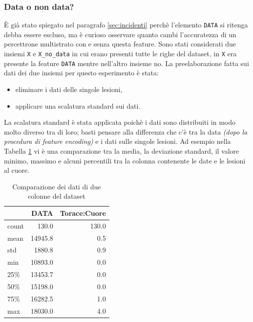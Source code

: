\documentclass[12pt, twoside, letterpaper]{report}
\begin{document}
			\subsubsection{Data o non data?}			
				È già stato spiegato nel paragrafo \ref{sec:incidenti} perchè l'elemento \texttt{DATA} si ritenga debba essere escluso, ma è curioso osservare quanto cambi l'accuratezza di un percettrone multistrato con e senza questa feature. Sono stati considerati due insiemi \texttt{X} e \texttt{X\_no\_data} in cui erano presenti tutte le righe del dataset, in \texttt{X} era presente la feature \texttt{DATA} mentre nell'altro insieme no. La preelaborazione fatta sui dati dei due insiemi per questo esperimento è stata: 
				\begin{itemize}
					\item eliminare i dati delle singole lesioni,
					\item applicare una scalatura standard sui dati.
				\end{itemize}
				La scalatura standard è stata applicata poichè i dati sono distribuiti in modo molto diverso tra di loro; basti pensare alla differenza che c'è tra la data \textit{(dopo la procedura di feature encoding)} e i dati sulle singole lesioni. Ad esempio nella Tabella \ref{tab:differenza_data} vi è una comparazione tra la media, la deviazione standard, il valore minimo, massimo e alcuni percentili tra la colonna contenente le date e le lesioni al cuore.
				
				\begin{table}
				\centering
				\begin{tabular}{lrr}
				\toprule
				{} &          DATA &  Torace:Cuore \\
				\midrule
				count &    130.0 &    130.0 \\
				mean  &  14945.8 &      0.5 \\
				std   &   1880.8 &      0.9 \\
				min   &  10893.0 &      0.0 \\
				25\%   &  13453.7 &      0.0 \\
				50\%   &  15198.0 &      0.0 \\
				75\%   &  16282.5 &      1.0 \\
				max   &  18030.0 &      4.0 \\
				\bottomrule
				\end{tabular}
				\caption{Comparazione dei dati di due colonne del dataset}
				\label{tab:differenza_data}
				\end{table}
				
\end{document}

